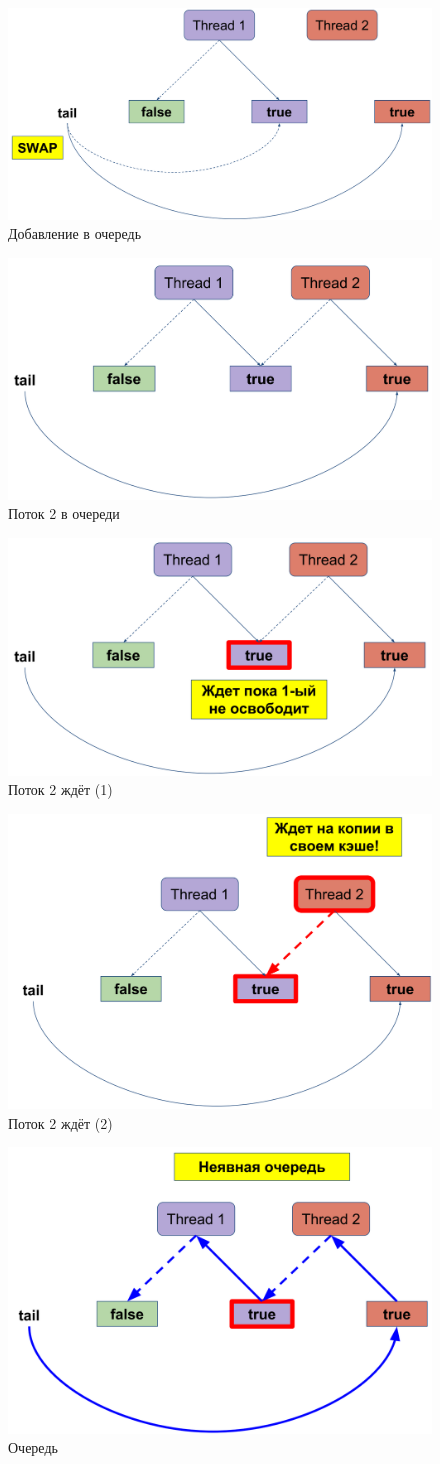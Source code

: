 \documentclass[10pt,a4paper,oneside,titlepage]{article}
\theoremstyle{plain}
\theoremstyle{defenition}
\begin{document}
\begin{figure}[h!]
	\centering
	\includegraphics[width=0.4\linewidth]{pictures/CLH8}
	\caption{Добавление в очередь}
	\label{fig:clh8}
\end{figure}

\begin{figure}[h!]
	\centering
	\includegraphics[width=0.4\linewidth]{pictures/CLH9}
	\caption{Поток 2 в очереди}
	\label{fig:clh9}
\end{figure}

\begin{figure}[h!]
	\centering
	\includegraphics[width=0.4\linewidth]{pictures/CLH10}
	\caption{Поток 2 ждёт (1)}
	\label{fig:clh10}
\end{figure}

\begin{figure}[h!]
	\centering
	\includegraphics[width=0.4\linewidth]{pictures/CLH11}
	\caption{Поток 2 ждёт (2)}
	\label{fig:clh11}
\end{figure}

\begin{figure}[h!]
	\centering
	\includegraphics[width=0.4\linewidth]{pictures/CLH12}
	\caption{Очередь}
	\label{fig:clh12}
\end{figure}
\end{document}

